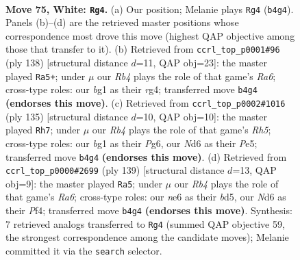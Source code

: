 \documentclass[11pt]{article}
\begin{document}
\clearpage

\begin{figure}[p]\centering
\begin{subfigure}{0.46\textwidth}\centering
\resizebox{\linewidth}{!}{%
\newchessgame
\chessboard[
  setfen={8/4k3/3Nn3/P7/1R6/7r/2K5/6b1 w - - 17 75},
  showmover=false,
  pgfstyle=straightmove, color=movearrow, markmove={b4-g4}
]}
\caption{}
\end{subfigure}\hfill
\begin{subfigure}{0.46\textwidth}\centering
\resizebox{\linewidth}{!}{%
\newchessgame
\chessboard[
  setfen={8/8/R7/3k4/3Nn1r1/8/8/2K5 w - - 8 70},
  showmover=false,
  pgfstyle=straightmove, color=movearrow, markmove={a6-a5}
]}
\caption{}
\end{subfigure}
\\[4pt]
\begin{subfigure}{0.46\textwidth}\centering
\resizebox{\linewidth}{!}{%
\newchessgame
\chessboard[
  setfen={8/8/k2N2p1/3Kp3/7r/8/8/1R6 b - - 34 68},
  showmover=false,
  pgfstyle=straightmove, color=movearrow, markmove={h4-h7}
]}
\caption{}
\end{subfigure}\hfill
\begin{subfigure}{0.46\textwidth}\centering
\resizebox{\linewidth}{!}{%
\newchessgame
\chessboard[
  setfen={8/6R1/8/3BK3/5p1k/r7/8/8 b - - 9 70},
  showmover=false,
  pgfstyle=straightmove, color=movearrow, markmove={a3-a5}
]}
\caption{}
\end{subfigure}
\caption{\textbf{Move 75, White: \texttt{Rg4}.} (a) Our position; Melanie plays \texttt{Rg4} (\texttt{b4g4}). Panels (b)--(d) are the retrieved master positions whose correspondence most drove this move (highest QAP objective among those that transfer to it). (b) Retrieved from \texttt{ccrl\_top\_p0001\#96} (ply 138) [structural distance $d$=11, QAP obj=23]: the master played \texttt{Ra5+}; under $\mu$ our \emph{Rb4} plays the role of that game's \emph{Ra6}; cross-type roles: our \emph{b}g1 as their \emph{r}g4; transferred move \texttt{b4g4} \textbf{(endorses this move)}. (c) Retrieved from \texttt{ccrl\_top\_p0002\#1016} (ply 135) [structural distance $d$=10, QAP obj=10]: the master played \texttt{Rh7}; under $\mu$ our \emph{Rb4} plays the role of that game's \emph{Rh5}; cross-type roles: our \emph{b}g1 as their \emph{P}g6, our \emph{N}d6 as their \emph{P}e5; transferred move \texttt{b4g4} \textbf{(endorses this move)}. (d) Retrieved from \texttt{ccrl\_top\_p0000\#2699} (ply 139) [structural distance $d$=13, QAP obj=9]: the master played \texttt{Ra5}; under $\mu$ our \emph{Rb4} plays the role of that game's \emph{Ra6}; cross-type roles: our \emph{n}e6 as their \emph{b}d5, our \emph{N}d6 as their \emph{P}f4; transferred move \texttt{b4g4} \textbf{(endorses this move)}. Synthesis: 7 retrieved analogs transferred to \texttt{Rg4} (summed QAP objective 59, the strongest correspondence among the candidate moves); Melanie committed it via the \texttt{search} selector.}
\label{fig:thought-m148}
\end{figure}
\end{document}
